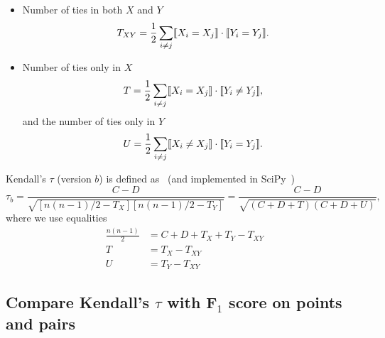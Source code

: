 \begin{itemize}
\item Number of ties in both $X$ and $Y$
      \begin{equation*}
      T_{XY} = \frac{1}{2} \sum_{i \ne j} \llbracket X_i = X_j \rrbracket \cdot \llbracket Y_i = Y_j \rrbracket.
      \end{equation*}

\item Number of ties only in $X$
      \begin{equation*}
      T = \frac{1}{2} \sum_{i \ne j} \llbracket X_i = X_j \rrbracket \cdot \llbracket Y_i \ne Y_j \rrbracket,
      \end{equation*}
      and the number of ties only in $Y$
      \begin{equation*}
      U = \frac{1}{2} \sum_{i \ne j} \llbracket X_i \ne X_j \rrbracket \cdot \llbracket Y_i = Y_j \rrbracket.
      \end{equation*}
\end{itemize}

Kendall's $\tau$ (version $b$) is defined as~\cite{kendall1945,agresti2010analysis} (and implemented in SciPy~\cite{scipy})
\begin{equation*}
\tau_b = \frac{C - D}{\sqrt{[n(n-1)/2 - T_X] [n(n-1)/2 - T_Y]}} = \frac{C - D}{\sqrt{(C + D + T) (C + D + U)}},
\end{equation*}
where we use equalities 
\begin{align*}
\frac{n(n-1)}{2} &= C + D + T_X + T_Y - T_{XY} \\
T &= T_X - T_{XY} \\
U &= T_Y - T_{XY}
\end{align*}



\subsection{Compare Kendall's $\tau$ with F$_1$ score on points and pairs}
\label{sec:metriccomparison}

